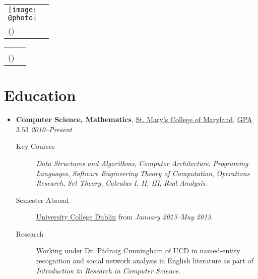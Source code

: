 \documentclass[11pt,letterpaper]{article}
\author{Sean Edward Allred}
\makeatletter
\newcommand{\position}[5]{\item%
  \begin{tabular*}{1.0\linewidth}{l@{\extracolsep{\fill}}r}
    #1 & #2\\
    \textit{#3} & \textit{#4---#5}
  \end{tabular*}}
\renewcommand{\position}[6][]{%
\item[#1] \hspace*{-2em}\textbf{#4}, #2, #3\hfill
  \textit{#5--#6}\vspace*{-.8em}}
\renewcommand{\maketitle}{%
  \noindent
  \ifdefined\@photo
  \usepackage{multirow}
  \begin{tabular*}{1.0\linewidth}{l@{\extracolsep{\fill}}r}
    \multirow{2}{*}{\texttt{[image: \\@photo]}}\\
     {\@namestyle\@author}           & \@addressA\\
    {\@emailstyle\@email} (\@phone)  & \@addressB
  \end{tabular*}
  \else
  \begin{tabular*}{1.0\linewidth}{l@{\extracolsep{\fill}}r}
     {\@namestyle\@author}           & \@addressA\\
    {\@emailstyle\@email} (\@phone)  & \@addressB
  \end{tabular*}
  \fi
}
\newcommand{\course}[1]{\textit{#1}}
\makeatother
\begin{document}
\maketitle

\section*{Education}
\begin{itemize}
\position[] {\href{http://www.smcm.edu}
                {St. Mary's College of Maryland}}
          {\href{http://dl.dropbox.com/u/17471132/transcript20130330.pdf}
                {GPA $3.53$}}
          {Computer Science, Mathematics}
          {2010}{Present}
          \begin{description}
          \item[Key Courses] \course{Data Structures and Algorithms},
            \course{Computer Architecture}, \course{Programing
              Languages}, \course{Software Engineering} \course{Theory
              of Computation}, \course{Operations Research},
            \course{Set Theory}, \course{Calculus I, II, III},
            \course{Real Analysis}.
          \item[Semester Abroad] \href{http://www.ucd.ie}{University
              College Dublin} from \textit{January 2013--May 2013}.
          \item[Research] Working under Dr. P\'adraig Cunningham of
            UCD in named-entity recognition and social network
            analysis in English literature as part of
            \textit{Introduction to Research in Computer Science}.
          \end{description}
\end{itemize}
\end{document}
